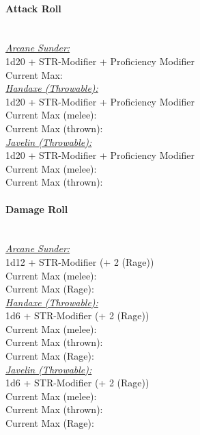 \documentclass[letterpaper,openany,oneside,twocolumn]{book}
\begin{document}
\paragraph*{Attack Roll}\hfill\\
\underline{\textit{Arcane Sunder:}}\\
1d20 + STR-Modifier + Proficiency Modifier\\
\indent Current Max: \\
\underline{\textit{Handaxe (Throwable):}}\\
1d20 + STR-Modifier + Proficiency Modifier\\
\indent Current Max (melee): \\
\indent Current Max (thrown): \\
\underline{\textit{Javelin (Throwable):}}\\
1d20 + STR-Modifier + Proficiency Modifier\\
\indent Current Max (melee): \\
\indent Current Max (thrown): 
\paragraph*{Damage Roll}\hfill\\
\underline{\textit{Arcane Sunder:}}\\
1d12 + STR-Modifier (+ 2 (Rage))\\
\indent Current Max (melee): \\
\indent Current Max (Rage): \\
\underline{\textit{Handaxe (Throwable):}}\\
1d6 + STR-Modifier (+ 2 (Rage))\\
\indent Current Max (melee): \\
\indent Current Max (thrown): \\
\indent Current Max (Rage): \\
\underline{\textit{Javelin (Throwable):}}\\
1d6 + STR-Modifier (+ 2 (Rage))\\
\indent Current Max (melee): \\
\indent Current Max (thrown): \\
\indent Current Max (Rage): 
\end{document}

